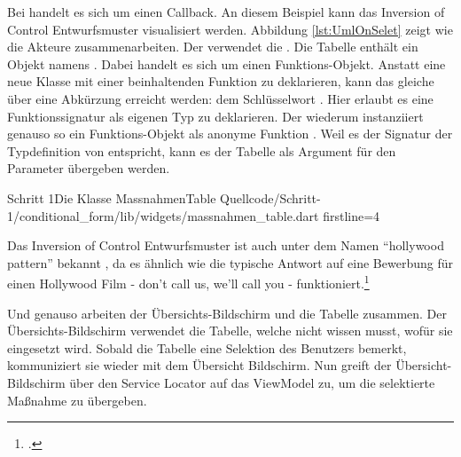 Bei  handelt es sich um einen Callback.
An diesem Beispiel kann das Inversion of Control Entwurfsmuster visualisiert werden.
Abbildung \ref{lst:UmlOnSelet} zeigt wie die Akteure zusammenarbeiten.
Der  verwendet die .
Die Tabelle enthält ein Objekt namens .
Dabei handelt es sich um einen Funktions-Objekt.
Anstatt eine neue Klasse mit einer beinhaltenden Funktion zu deklarieren, kann das gleiche über eine Abkürzung erreicht werden: dem Schlüsselwort  .
Hier erlaubt es eine Funktionssignatur als eigenen Typ zu deklarieren.
Der  wiederum instanziiert genauso so ein Funktions-Objekt als anonyme Funktion .
Weil es der Signatur der Typdefinition von   entspricht, kann es der Tabelle als Argument für den Parameter  übergeben werden. 

\ifIncludeFigures \clearpage \fi

\begin{alexlisting}{Schritt 1}{Die Klasse MassnahmenTable}
  {Quellcode/Schritt-1/conditional_form/lib/widgets/massnahmen_table.dart}
  {firstline=4}
  \label{lst:Schritt1KlasseMassnahmenTable}
\end{alexlisting}

\ifIncludeFigures \clearpage \fi


Das Inversion of Control Entwurfsmuster ist auch unter dem Namen \enquote{hollywood pattern} bekannt , da es ähnlich wie die typische Antwort auf eine Bewerbung für einen Hollywood Film - don’t call us, we’ll call you - funktioniert.\footcite[Vgl.][]{fowler2005InversionOfControl}

Und genauso arbeiten der Übersichts-Bildschirm und die Tabelle zusammen.
Der Übersichts-Bildschirm verwendet die Tabelle, welche nicht wissen musst, wofür sie eingesetzt wird.
Sobald die Tabelle eine Selektion des Benutzers bemerkt, kommuniziert sie wieder mit dem Übersicht Bildschirm.
Nun greift der Übersicht-Bildschirm über den Service Locator auf das ViewModel zu, um die selektierte Maßnahme zu übergeben. 

